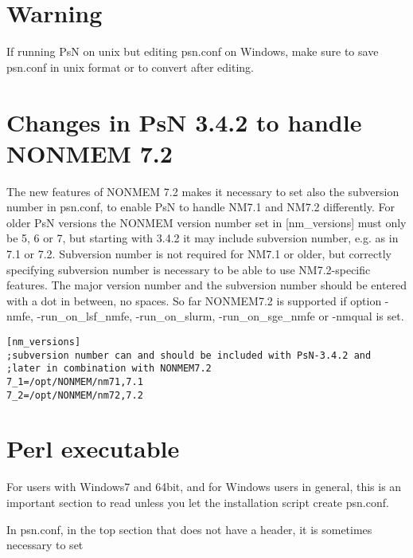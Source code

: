 \section{Warning}
If running PsN on unix but editing psn.conf on Windows, make sure to save psn.conf in unix format or to convert after editing.

\section{Changes in PsN 3.4.2 to handle NONMEM 7.2}
The new features of NONMEM 7.2 makes it necessary to set also the subversion number in psn.conf, to enable PsN to handle NM7.1 and NM7.2 differently. For older PsN versions the NONMEM version  number set in [nm\_versions] must only be 5, 6 or 7, but starting with 3.4.2 it may include subversion number, e.g. as in 7.1 or 7.2. Subversion number is not required for NM7.1 or older, but correctly specifying subversion number is necessary to be able to use NM7.2-specific features. The major version number and the subversion number should be entered with a dot in between, no spaces.  
So far NONMEM7.2 is supported if option -nmfe, -run\_on\_lsf\_nmfe, -run\_on\_slurm, -run\_on\_sge\_nmfe or -nmqual is set. 
\begin{verbatim}
[nm_versions]
;subversion number can and should be included with PsN-3.4.2 and
;later in combination with NONMEM7.2 
7_1=/opt/NONMEM/nm71,7.1
7_2=/opt/NONMEM/nm72,7.2
\end{verbatim}


\section{Perl executable}


For users with Windows7 and 64bit, and for Windows users in general, this is an important section to read unless you let the installation script create psn.conf.

In psn.conf, in the top section that does not have a header, it is sometimes necessary to set

